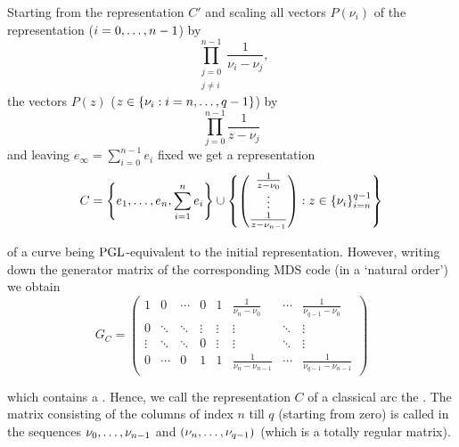 Starting from the representation $C'$ and scaling all vectors $P(\nu_i)$ of the representation ($i=\range 0 {n-1}$) by
$$ \prod_{\substack{j=0\\ j\neq i}}^{n-1}{\frac{1}{\nu_i-\nu_j}}\textrm{,} $$
the vectors $P(z)$ ($z\in\set{\nu_i}[i=n,\ldots,q-1]$) by 
$$ \prod_{j=0}^{n-1}{\frac{1}{z-\nu_j}} $$
and leaving $e_{\infty}=\sum_{i=0}^{n-1}{e_i}$ fixed we get a representation
$$
C = \set{e_1,\ldots,e_n,\sum_{i=1}^n{e_i}}\setjoin\set{\begin{pmatrix} \frac{1}{z-\nu_0} \\ \vdots\\ \frac{1}{z-\nu_{n-1}}\end{pmatrix}}[z\in\set{\nu_i}_{i=n}^{q-1}]
$$

of a curve being $\mathrm{PGL}$-equivalent to the initial representation.
However, writing down the generator matrix of the corresponding MDS code (in a `natural order') we obtain
$$ G_C =
    \begin{pmatrix}
        1      & 0      & \cdots & 0      & 1      & \frac{1}{\nu_n-\nu_0} & \cdots & \frac{1}{\nu_{q-1}-\nu_0} \\
        0      & \ddots & \ddots & \vdots & \vdots & \vdots                & \ddots & \vdots            \\
        \vdots & \ddots & \ddots & 0      & \vdots & \vdots                & \ddots & \vdots            \\
        0      & \cdots & 0      & 1      & 1      & \frac{1}{\nu_n-\nu_{n-1}} & \cdots & \frac{1}{\nu_{q-1}-\nu_{n-1}}
    \end{pmatrix} $$

which contains a . Hence, we call the representation $C$ of a classical arc the . The matrix consisting of the columns of index $n$ till $q$ (starting from zero) is called  in the sequences $\range{\nu_0}{\nu_{n-1}}$ and $\seq{\range{\nu_n}{\nu_{q-1}}}$ (which is a totally regular matrix).\label{cauchy-rep}

